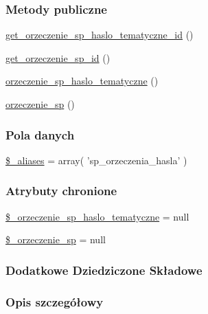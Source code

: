 \subsubsection*{Metody publiczne}
\begin{DoxyCompactItemize}
\item 
\hyperlink{classep___s_p___haslo_a27b4d0ce00b8536e5032af6fcd2bd77d}{get\-\_\-orzeczenie\-\_\-sp\-\_\-haslo\-\_\-tematyczne\-\_\-id} ()
\item 
\hyperlink{classep___s_p___haslo_a98a84a7375b3d05cb4516bbb2c7f3e04}{get\-\_\-orzeczenie\-\_\-sp\-\_\-id} ()
\item 
\hyperlink{classep___s_p___haslo_a62333df073de2eff05c3084aea3c0a05}{orzeczenie\-\_\-sp\-\_\-haslo\-\_\-tematyczne} ()
\item 
\hyperlink{classep___s_p___haslo_a498c7b61096c1bcb941e93a8d1385318}{orzeczenie\-\_\-sp} ()
\end{DoxyCompactItemize}
\subsubsection*{Pola danych}
\begin{DoxyCompactItemize}
\item 
\hyperlink{classep___s_p___haslo_ab4e31d75f0bc5d512456911e5d01366b}{\$\-\_\-aliases} = array( 'sp\-\_\-orzeczenia\-\_\-hasla' )
\end{DoxyCompactItemize}
\subsubsection*{Atrybuty chronione}
\begin{DoxyCompactItemize}
\item 
\hyperlink{classep___s_p___haslo_ad00ee90f32b429d419d6e1024bcda64b}{\$\-\_\-orzeczenie\-\_\-sp\-\_\-haslo\-\_\-tematyczne} = null
\item 
\hyperlink{classep___s_p___haslo_aa2e1ecb50e6fae26a854ac995f7226b8}{\$\-\_\-orzeczenie\-\_\-sp} = null
\end{DoxyCompactItemize}
\subsubsection*{Dodatkowe Dziedziczone Składowe}


\subsubsection{Opis szczegółowy}


